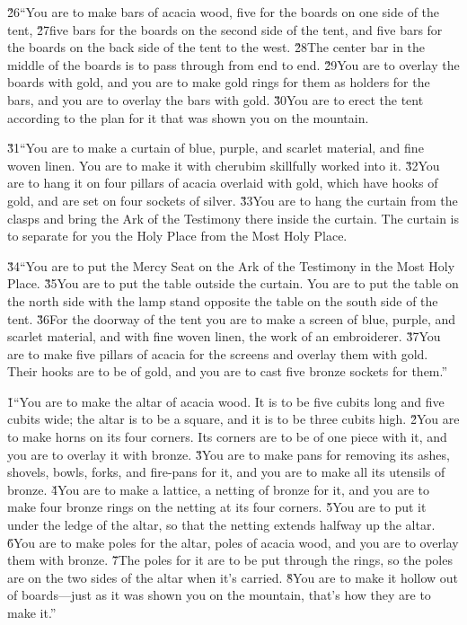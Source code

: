 \v{26}``You are to make bars of acacia wood, five for the boards on one side of the tent, \v{27}five bars for the boards on the second side of the tent, and five bars for the boards on the back side of the tent to the west. \v{28}The center bar in the middle of the boards is to pass through from end to end. \v{29}You are to overlay the boards with gold, and you are to make gold rings for them as holders for the bars, and you are to overlay the bars with gold. \v{30}You are to erect the tent according to the plan for it that was shown you on the mountain.

\v{31}``You are to make a curtain of blue, purple, and scarlet material, and fine woven linen. You are to make it with cherubim skillfully worked into it. \v{32}You are to hang it on four pillars of acacia overlaid with gold, which have hooks of gold, and are set on four sockets of silver. \v{33}You are to hang the curtain from the clasps and bring the Ark of the Testimony there inside the curtain. The curtain is to separate for you the Holy Place from the Most Holy Place.

\v{34}``You are to put the Mercy Seat on the Ark of the Testimony in the Most Holy Place. \v{35}You are to put the table outside the curtain. You are to put the table on the north side with the lamp stand opposite the table on the south side of the tent. \v{36}For the doorway of the tent you are to make a screen of blue, purple, and scarlet material, and with fine woven linen, the work of an embroiderer. \v{37}You are to make five pillars of acacia for the screens and overlay them with gold. Their hooks are to be of gold, and you are to cast five bronze sockets for them.''

\v{1}``You are to make the altar of acacia wood. It is to be five cubits long and five cubits wide; the altar is to be a square, and it is to be three cubits high. \v{2}You are to make horns on its four corners. Its corners are to be of one piece with it, and you are to overlay it with bronze. \v{3}You are to make pans for removing its ashes, shovels, bowls, forks, and fire-pans for it, and you are to make all its utensils of bronze. \v{4}You are to make a lattice, a netting of bronze for it, and you are to make four bronze rings on the netting at its four corners. \v{5}You are to put it under the ledge of the altar, so that the netting extends halfway up the altar. \v{6}You are to make poles for the altar, poles of acacia wood, and you are to overlay them with bronze. \v{7}The poles for it are to be put through the rings, so the poles are on the two sides of the altar when it's carried. \v{8}You are to make it hollow out of boards---just as it was shown you on the mountain, that's how they are to make it.''

